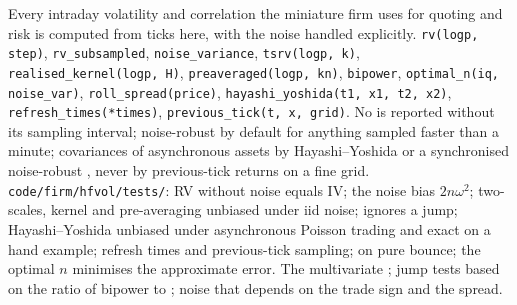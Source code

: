 \begin{build}
 Every intraday volatility and correlation the miniature firm uses for quoting and risk is computed from ticks here, with the noise handled explicitly.
 \texttt{rv(logp, step)}, \texttt{rv\_subsampled}, \texttt{noise\_variance}, \texttt{tsrv(logp, k)}, \texttt{realised\_kernel(logp, H)},
\texttt{preaveraged(logp, kn)}, \texttt{bipower}, \texttt{optimal\_n(iq, noise\_var)}, \texttt{roll\_spread(price)}, \texttt{hayashi\_yoshida(t1, x1, t2, x2)},
\texttt{refresh\_times(*times)}, \texttt{previous\_tick(t, x, grid)}.
 No  is reported without its sampling interval; noise-robust  by default for anything sampled faster than a minute; covariances of
asynchronous assets by Hayashi--Yoshida or a synchronised noise-robust , never by previous-tick returns on a fine grid.
 \texttt{code/firm/hfvol/tests/}: RV without noise equals IV; the noise bias $2n\omega^2$; two-scales, kernel and pre-averaging unbiased under iid noise;
 ignores a jump; Hayashi--Yoshida unbiased under asynchronous Poisson trading and exact on a hand example; refresh times and previous-tick sampling;
 on pure bounce; the optimal $n$ minimises the approximate error.
 The multivariate ; jump tests based on the ratio of bipower to ; noise that depends on the trade sign and the spread.
\end{build}

